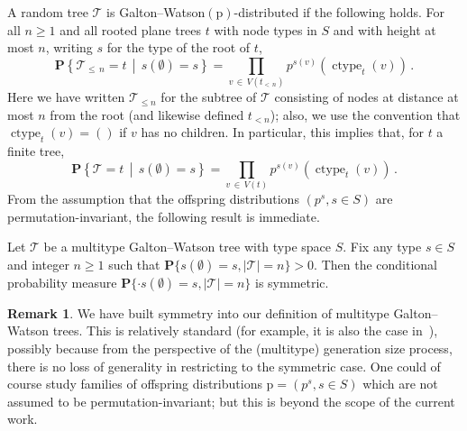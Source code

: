 \documentclass[10pt]{amsart}
\theoremstyle{definition}\newtheorem{defi}[theo]{Definition}\newtheorem{rema}[theo]{Remark}\newtheorem{exam}[theo]{Example}\newtheorem{exem}[theo]{Example}\newtheorem{nota}[theo]{Notation}
\newcommand{\cT}{\mathcal{T}}
\newcommand{\bP}{\mathbf{P}}
\newcommand{\rp}{\mathrm{p}}
\DeclareMathOperator{\cht}{ctype}
\newcommand{\p}[1]{\mathbf{P}\left\{#1\right\}}
\begin{document}
A random tree $\cT$ is Galton--Watson$(\rp)$-distributed if the following holds. For all $n \ge 1$ and all rooted plane trees $t$ with node types in $S$ and with height at most $n$, writing $s$ for the type of the root of $t$,
\[
\p{\cT_{\le\,n} = t\,\middle|\,s(\emptyset)=s} = \prod_{v\,\in\, V(t_{<\,n})} p^{s(v)}(\cht_t(v))\,.
\]
Here we have written $\cT_{\le n}$ for the subtree of $\cT$ consisting of nodes at distance at most $n$ from the root (and likewise defined $t_{<n}$); also, we use the convention that $\cht_t(v)=()$ if $v$ has no children. In particular, this implies that, for $t$ a finite tree,
\[
\p{\cT = t\,\middle|\,s(\emptyset)=s} = \prod_{v\,\in\,V(t)} p^{s(v)}(\cht_t(v))\,.
\]
From the assumption that the offspring distributions $(p^s,s \in S)$ are permutation-invariant, the following result is immediate.

\begin{prop}\label{prop:GWSym}
Let $\cT$ be a multitype Galton--Watson tree with type space $S$. Fix any type $s \in S$ and integer $n \ge 1$ such that $\bP\{s(\emptyset)=s,|\cT|=n\}>0$. Then the conditional probability measure $\bP\{\cdot s(\emptyset)=s,|\cT|=n\}$ is symmetric.
\end{prop}


\begin{rema}
We have built symmetry into our definition of multitype Galton--Watson trees. This is relatively standard (for example, it is also the case in~\cite{MiermontInvarianceTrees}), possibly because from the perspective of the (multitype) generation size process, there is no loss of generality in restricting to the symmetric case. One could of course study families of offspring distributions $\rp=(p^s,s \in S)$ which are not assumed to be permutation-invariant; but this is beyond the scope of the current work.
\end{rema}
\end{document}
